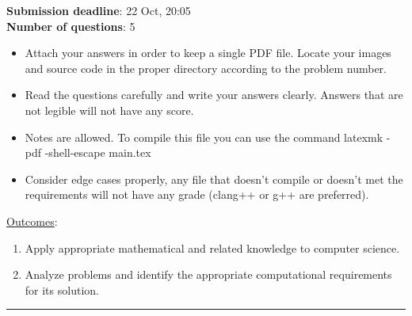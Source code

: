 



\textbf{Submission deadline}: 22 Oct, 20:05\\ 
\textbf{Number of questions}: 5

\begin{itemize}
    \item Attach your answers in order to keep a single PDF file. 
        Locate your images and source code in the proper directory according to the problem number.
    \item Read the questions carefully and write your answers clearly. Answers that are not legible will not have any score. 
    \item Notes are allowed. To compile this file you can use the command latexmk -pdf -shell-escape main.tex
    \item Consider edge cases properly, any file that doesn't compile or doesn't met the requirements will not have any grade (clang++ or g++ are preferred).
\end{itemize}

\underline{Outcomes}:

\begin{enumerate}[label=\alph*.]
    \item Apply appropriate mathematical and related knowledge to computer science.
    \item Analyze problems and identify the appropriate computational requirements for its solution.
\end{enumerate}
\noindent\rule{\textwidth}{0.01pt}
\vspace{4mm}

